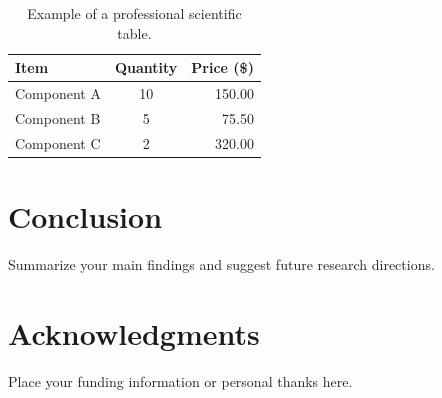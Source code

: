 \documentclass[11pt,a4paper]{article}
\begin{document}
\begin{table}[htbp]
\centering
\caption{Example of a professional scientific table.}
\label{tab:example}
\begin{tabular}{lcr}
\toprule
\textbf{Item} & \textbf{Quantity} & \textbf{Price (\$)} \\
\midrule
Component A & 10 & 150.00 \\
Component B & 5  & 75.50  \\
Component C & 2  & 320.00 \\
\bottomrule
\end{tabular}
\end{table}

\section{Conclusion}
Summarize your main findings and suggest future research directions.

\section*{Acknowledgments}
Place your funding information or personal thanks here.

\printbibliography
\end{document}
